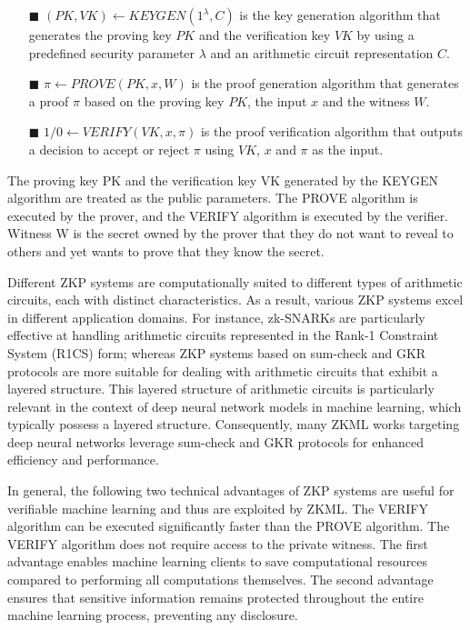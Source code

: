 \documentclass[journal]{IEEEtran}
\begin{document}
\begin{itemize}
    \item[$\blacksquare$] $(PK, VK) \leftarrow KEYGEN(1^\lambda, C)$ is the key generation algorithm that generates the proving key $PK$ and the verification key $VK$ by using a predefined security parameter $\lambda$ and an arithmetic circuit representation $C$.
    \item[$\blacksquare$] $\pi \leftarrow PROVE(PK, x, W)$ is the proof generation algorithm that generates a proof $\pi$ based on the proving key $PK$, the input $x$ and the witness $W$.
    \item[$\blacksquare$] $1/0 \leftarrow VERIFY(VK, x, \pi)$ is the proof verification algorithm that outputs a decision to accept or reject $\pi$ using $VK$, $x$ and $\pi$ as the input.
\end{itemize}
The proving key PK and the verification key VK generated by the KEYGEN algorithm are treated as the public parameters. The PROVE algorithm is executed by the prover, and the VERIFY algorithm is executed by the verifier. Witness W is the secret owned by the prover that they do not want to reveal to others and yet wants to prove that they know the secret.

Different ZKP systems are computationally suited to different types of arithmetic circuits, each with distinct characteristics. As a result, various ZKP systems excel in different application domains. For instance, zk-SNARKs are particularly effective at handling arithmetic circuits represented in the Rank-1 Constraint System (R1CS) form; whereas ZKP systems based on sum-check \cite{lund1992algebraic} and GKR \cite{thaler2015note} protocols are more suitable for dealing with arithmetic circuits that exhibit a layered structure. This layered structure of arithmetic circuits is particularly relevant in the context of deep neural network models in machine learning, which typically possess a layered structure. Consequently, many ZKML works targeting deep neural networks leverage sum-check and GKR protocols for enhanced efficiency and performance.

In general, the following two technical advantages of ZKP systems are useful for verifiable machine learning and thus are exploited by ZKML. The VERIFY algorithm can be executed significantly faster than the PROVE algorithm. The VERIFY algorithm does not require access to the private witness. The first advantage enables machine learning clients to save computational resources compared to performing all computations themselves. The second advantage ensures that sensitive information remains protected throughout the entire machine learning process, preventing any disclosure.
\end{document}
